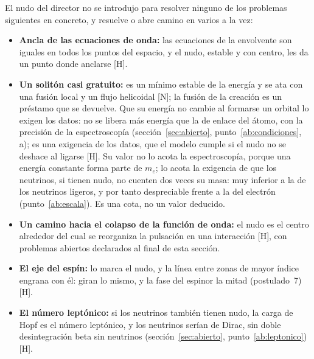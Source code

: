 \documentclass[11pt,a4paper]{article}
\newcommand{\st}[1]{\textup{[#1]}}
\begin{document}
El nudo del director no se introdujo para resolver ninguno de los problemas siguientes en concreto, y resuelve o abre camino en varios a la vez:
\begin{itemize}[leftmargin=*,itemsep=0.1em]
\item \textbf{Ancla de las ecuaciones de onda:} las ecuaciones de la envolvente son iguales en todos los puntos del espacio, y el nudo, estable y con centro, les da un punto donde anclarse \st{H}.
\item \textbf{Un solitón casi gratuito:} es un mínimo estable de la energía y se ata con una fusión local y un flujo helicoidal \st{N}; la fusión de la creación es un préstamo que se devuelve. Que su energía no cambie al formarse un orbital lo exigen los datos: no se libera más energía que la de enlace del átomo, con la precisión de la espectroscopía (sección~\ref{sec:abierto}, punto~\ref{ab:condiciones}, a); es una exigencia de los datos, que el modelo cumple si el nudo no se deshace al ligarse \st{H}. Su valor no lo acota la espectroscopía, porque una energía constante forma parte de $m_e$; lo acota la exigencia de que los neutrinos, si tienen nudo, no cuenten dos veces su masa: muy inferior a la de los neutrinos ligeros, y por tanto despreciable frente a la del electrón (punto~\ref{ab:escala}). Es una cota, no un valor deducido.
\item \textbf{Un camino hacia el colapso de la función de onda:} el nudo es el centro alrededor del cual se reorganiza la pulsación en una interacción \st{H}, con problemas abiertos declarados al final de esta sección.
\item \textbf{El eje del espín:} lo marca el nudo, y la línea entre zonas de mayor índice engrana con él: giran lo mismo, y la fase del espinor la mitad (postulado~7) \st{H}.
\item \textbf{El número leptónico:} si los neutrinos también tienen nudo, la carga de Hopf es el número leptónico, y los neutrinos serían de Dirac, sin doble desintegración beta sin neutrinos (sección~\ref{sec:abierto}, punto~\ref{ab:leptonico}) \st{H}.
\end{itemize}
\end{document}
